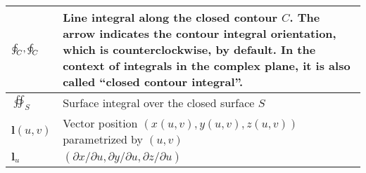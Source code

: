 \begin{xltabular}{\textwidth}{XX}
	\(\oint_C, \varointctrclockwise_C\)                                                                                                                                                                                                                                                                & Line integral along the closed contour \(C\). The arrow indicates the contour integral orientation, which is counterclockwise, by default. In the context of integrals in the complex plane, it is also called ``closed contour integral''.                                                                                         \\ \hline
	\(\oiint_S\)                                                                                                                                                                                                                                                                                       & Surface integral over the closed surface \(S\)                                                                                                                                                                                                                                                                                      \\ \hline
	\(\mathbf{l}(u,v)\)                                                                                                                                                                                                                                                                                & Vector position \((x(u,v), y(u,v), z(u,v))\) parametrized by \((u,v)\)                                                                                                                                                                                                                                                              \\ \hline
	\(\mathbf{l}_u\)                                                                                                                                                                                                                                                                                   & \((\partial x/ \partial u, \partial y/ \partial u, \partial z/ \partial u)\)                                                                                                                                                                                                                                                        \\ \hline

\end{xltabular}
